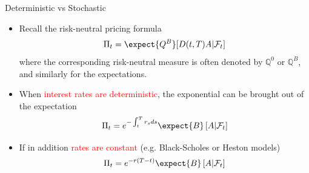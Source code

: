 \documentclass{beamer}
\begin{document}
\begin{frame}{Deterministic vs Stochastic}
	\begin{itemize}
		\item<0-> Recall the risk-neutral pricing formula \begin{equation*}
			\Pi_t = \expect{Q^B}[D(t,T)A|\mathcal{F}_t]
		\end{equation*}
		where the corresponding risk-neutral measure is often denoted by $\mathbb{Q}^0$ or $\mathbb{Q}^B$, and similarly for the expectations. 
		\item<1-> When \textcolor{red}{interest rates are deterministic}, the exponential can be brought out of the expectation
		\begin{equation*}
			\Pi_t = e^{-\int_t^T r_s ds} \expect{B}\left[A|\mathcal{F}_t\right]
		\end{equation*}
		\item<2-> If in addition \textcolor{red}{rates are constant} (e.g. Black-Scholes or Heston models)
		\begin{equation*}
			\Pi_t = e^{-r(T-t)}\expect{B}\left[A|\mathcal{F}_t\right]
		\end{equation*}
	\end{itemize}
\end{frame}
\end{document}
